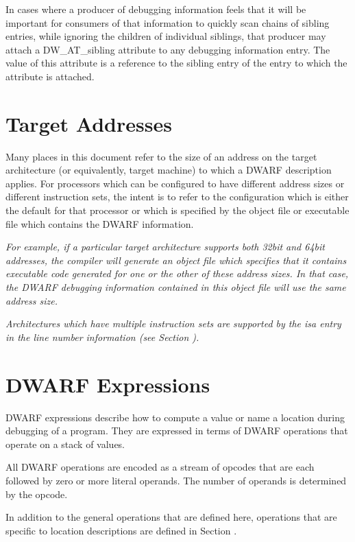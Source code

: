 In cases where a producer of debugging information feels that
it will be important for consumers of that information to
quickly scan chains of sibling entries, while ignoring the
children of individual siblings, that producer may attach a
DW\_AT\_sibling attribute to any debugging information entry. 
The
value of this attribute is a reference to the sibling entry
of the entry to which the attribute is attached.


\section{Target Addresses}
\label{chap:targetaddresses}
Many places in this document refer to the size of an address
on the target architecture (or equivalently, target machine)
to which a DWARF description applies. For processors which
can be configured to have different address sizes or different
instruction sets, the intent is to refer to the configuration
which is either the default for that processor or which is
specified by the object file or executable file which contains
the DWARF information.



\textit{
For example, if a particular target architecture supports
both 32\dash bit and 64\dash bit addresses, the compiler will generate
an object file which specifies that it contains executable
code generated for one or the other of these address sizes. In
that case, the DWARF debugging information contained in this
object file will use the same address size.
}

\textit{
Architectures which have multiple instruction sets are
supported by the isa entry in the line number information
(see Section ).
}


\section{DWARF Expressions}
\label{chap:dwarfexpressions}
DWARF expressions describe how to compute a value or name a
location during debugging of a program. 
They are expressed in
terms of DWARF operations that operate on a stack of values.

All DWARF operations are encoded as a stream of opcodes that
are each followed by zero or more literal operands. 
The number
of operands is determined by the opcode.  

In addition to the
general operations that are defined here, operations that are
specific to location descriptions are defined in 
Section  .

